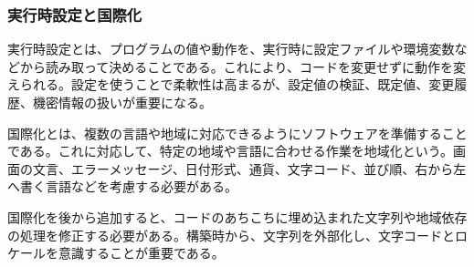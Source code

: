 \subsubsection{実行時設定と国際化}

実行時設定とは、プログラムの値や動作を、実行時に設定ファイルや環境変数などから読み取って決めることである。これにより、コードを変更せずに動作を変えられる。設定を使うことで柔軟性は高まるが、設定値の検証、既定値、変更履歴、機密情報の扱いが重要になる。

国際化とは、複数の言語や地域に対応できるようにソフトウェアを準備することである。これに対応して、特定の地域や言語に合わせる作業を地域化という。画面の文言、エラーメッセージ、日付形式、通貨、文字コード、並び順、右から左へ書く言語などを考慮する必要がある。

国際化を後から追加すると、コードのあちこちに埋め込まれた文字列や地域依存の処理を修正する必要がある。構築時から、文字列を外部化し、文字コードとロケールを意識することが重要である。
